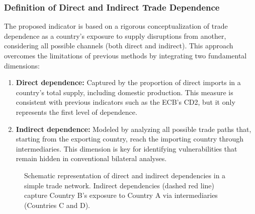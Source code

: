 \documentclass[final,1p,times,authoryear]{elsarticle}
\begin{document}
\subsubsection{Definition of Direct and Indirect Trade Dependence}

The proposed indicator is based on a rigorous conceptualization of trade dependence as a country’s exposure to supply disruptions from another, considering all possible channels (both direct and indirect). This approach overcomes the limitations of previous methods by integrating two fundamental dimensions:

\begin{enumerate}
    \item \textbf{Direct dependence:} Captured by the proportion of direct imports in a country’s total supply, including domestic production. This measure is consistent with previous indicators such as the ECB's CD2, but it only represents the first level of dependence.

    \item \textbf{Indirect dependence:} Modeled by analyzing all possible trade paths that, starting from the exporting country, reach the importing country through intermediaries. This dimension is key for identifying vulnerabilities that remain hidden in conventional bilateral analyses.
\end{enumerate}

\begin{figure}[t]
\centering
{}
\caption{Schematic representation of direct and indirect dependencies in a simple trade network. Indirect dependencies (dashed red line) capture Country B’s exposure to Country A via intermediaries (Countries C and D).}
\label{fig:direct-indirect}
\end{figure}
\end{document}
